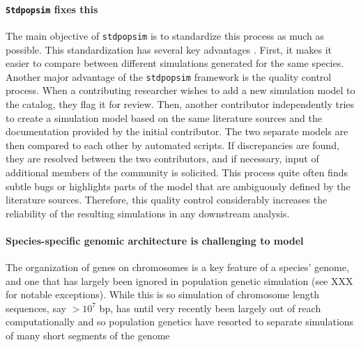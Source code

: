 \documentclass[hidelinks]{article}
\newcommand{\Stdpopsim}{\texttt{Stdpopsim}\xspace}
\newcommand{\stdpopsim}{\texttt{stdpopsim}\xspace}
\begin{document}
\paragraph*{\Stdpopsim fixes this}
The main objective of \texttt{\stdpopsim} is to standardize this process as much as possible.
This standardization has several key advantages \citep{Adrion2020}. First, it makes it easier to compare between different
simulations generated for the same species. Another major advantage of the
\texttt{\stdpopsim} framework is the quality control process.
When a contributing researcher wishes to add a new simulation model to the catalog,
they flag it for review. Then, another contributor independently tries to create a simulation model based on the same literature sources and the documentation provided by the initial contributor. The two separate models are then
compared to each other by automated scripts. If discrepancies are found, they
are resolved between the two contributors, and if necessary, input of additional members of the community is solicited. This process quite often
finds subtle bugs  \citep{Ragsdale2020} or highlights parts of the model that are
ambiguously defined by the literature sources. 
Therefore, this quality control considerably increases the reliability of the
resulting simulations in any downstream analysis.


\paragraph*{%
  \textbf{Species-specific genomic architecture is challenging to model}}
The organization of genes on chromosomes is a key feature of a species' genome,
and one that has largely been ignored in population genetic simulation (see XXX for notable exceptions).
While this is so simulation of chromosome length sequences, say $ > 10^7$ bp, 
has until very recently been largely out of reach computationally
and so population genetics have resorted to separate simulations of many short segments
of the genome
   
\end{document}
